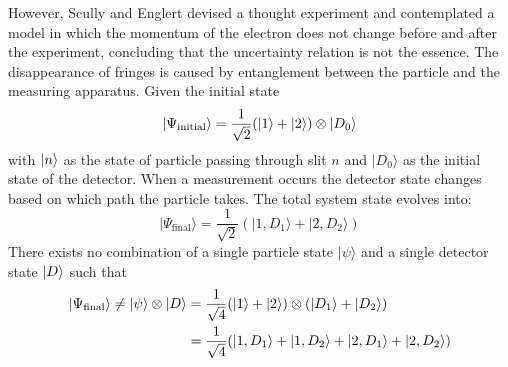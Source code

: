 \documentclass[../../../main.tex]{subfiles}
\begin{document}
However, Scully and Englert devised a thought experiment and contemplated a model in which the momentum of the electron does not change before and after the experiment, concluding that the uncertainty relation is not the essence.
The disappearance of fringes is caused by entanglement between the particle and the measuring apparatus.
Given the initial state
\begin{equation*}
  |\Psi_{\text{initial}}\rangle = \frac{1}{\sqrt{2}} (\ket{1} + \ket{2}) \otimes |D_0\rangle
\end{equation*}
with $\ket{n}$ as the state of particle passing through slit $n$ and \( |D_0\rangle \) as the  initial state of the detector.
When a measurement occurs the detector state changes based on which path the particle takes.
The total system state evolves into:
\begin{equation*}
  |\Psi_{\text{final}}\rangle =
  \frac{1}{\sqrt{2}} (|1,D_1\rangle + |2,D_2\rangle)
\end{equation*}
There exists no combination of a single particle state \( |\psi\rangle \) and a single detector state \( \ket{D} \) such that
\begin{align*}
  \ket{\Psi_{\text{final}}}  \neq |\psi\rangle \otimes \ket{D} & =
  \frac{1}{\sqrt{4}} (\ket{1} + \ket{2}) \otimes (\ket{D_1}+\ket{D_2}) \\
                                                               & =
  \frac{1}{\sqrt{4}} ( \ket{1,D_1} + \ket{1,D_2}+ \ket{2,D_1}+ \ket{2,D_2})
\end{align*}
\end{document}
